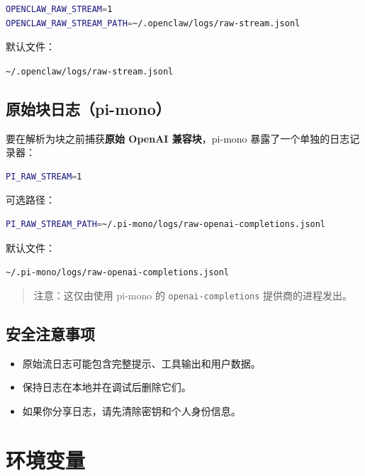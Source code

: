 \begin{lstlisting}[language=bash]
OPENCLAW_RAW_STREAM=1
OPENCLAW_RAW_STREAM_PATH=~/.openclaw/logs/raw-stream.jsonl
\end{lstlisting}


默认文件：

\texttt{\textasciitilde{}/.openclaw/logs/raw-stream.jsonl}

\subsection{原始块日志（pi-mono）}


要在解析为块之前捕获\textbf{原始 OpenAI 兼容块}，pi-mono 暴露了一个单独的日志记录器：

\begin{lstlisting}[language=bash]
PI_RAW_STREAM=1
\end{lstlisting}


可选路径：

\begin{lstlisting}[language=bash]
PI_RAW_STREAM_PATH=~/.pi-mono/logs/raw-openai-completions.jsonl
\end{lstlisting}


默认文件：

\texttt{\textasciitilde{}/.pi-mono/logs/raw-openai-completions.jsonl}

\begin{quote}
注意：这仅由使用 pi-mono 的 \texttt{openai-completions} 提供商的进程发出。
\end{quote}


\subsection{安全注意事项}


\begin{itemize}
  \item 原始流日志可能包含完整提示、工具输出和用户数据。
  \item 保持日志在本地并在调试后删除它们。
  \item 如果你分享日志，请先清除密钥和个人身份信息。
\end{itemize}



\clearpage

\section{环境变量}


